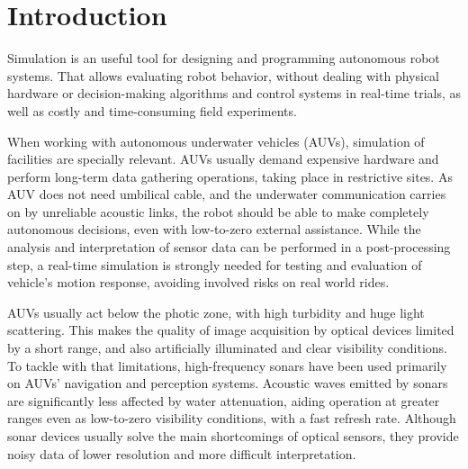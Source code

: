 \documentclass[final,5p,times]{elsarticle}
\begin{document}
\linenumbers

\section{Introduction}
\label{introduction}

Simulation is an useful tool for designing and programming autonomous robot
systems. That allows evaluating robot behavior, without dealing with physical
hardware or decision-making algorithms and control systems in real-time
trials, as well as costly and time-consuming field experiments.

When working with autonomous underwater vehicles (AUVs), simulation of
facilities are specially relevant. AUVs usually demand expensive hardware and
perform long-term data gathering operations, taking place in restrictive
sites. As AUV does not need umbilical cable, and the underwater communication
carries on by unreliable acoustic links, the robot should be able to make
completely autonomous decisions, even with low-to-zero external assistance.
While the analysis and interpretation of sensor data can be performed in a
post-processing step, a real-time simulation is strongly needed for testing
and evaluation of vehicle's motion response, avoiding involved risks on
real world rides.

AUVs usually act below the photic zone, with high turbidity and huge light
scattering. This makes the quality of image acquisition by optical devices
limited by a short range, and also artificially illuminated and clear visibility conditions. To tackle with that limitations, high-frequency sonars have been used primarily on AUVs' navigation and perception systems. Acoustic waves emitted by sonars are significantly less affected by water attenuation,
aiding operation at greater ranges even as low-to-zero visibility conditions,
with a fast refresh rate. Although sonar devices usually solve the main shortcomings of optical sensors, they provide noisy data of lower resolution and more difficult interpretation.
\end{document}
